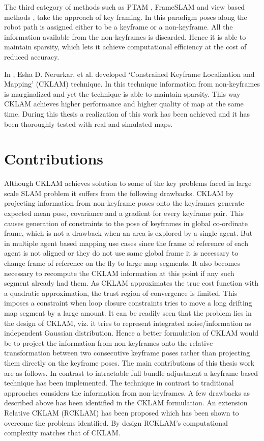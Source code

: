 The third category of methods such as PTAM \cite{klein07parallel}, FrameSLAM \cite{4648456} and view based methods \cite {Konolige01072010, 6630556}, take the approach of key framing. In this paradigm poses along the robot path is assigned either to be a keyframe or a non-keyframe. All the information available from the non-keyframes is discarded. Hence it is able to maintain sparsity, which lets it achieve computational efficiency at the cost of reduced accuracy. 

In \cite{CKLAM}, Esha D. Nerurkar, et al. developed `Constrained Keyframe Localization and Mapping' (CKLAM) technique. In this technique information from non-keyframes is marginalized and yet the technique is able to maintain sparsity. This way CKLAM achieves higher performance and higher quality of map at the same time. During this thesis a realization of this work has been achieved and it has been thoroughly tested with real and simulated maps. 

\section{Contributions}
Although CKLAM achieves solution to some of the key problems faced in large scale SLAM problem it suffers from the following drawbacks. CKLAM by projecting information from non-keyframe poses onto the keyframes generate expected mean pose, covariance and a gradient for every keyframe pair. This causes generation of constraints to the pose of keyframes in global co-ordinate frame, which is not a drawback when an area is explored by a single agent. But in multiple agent based mapping use cases since the frame of reference of each agent is not aligned or they do not use same global frame it is necessary to change frame of reference on the fly to large map segments. It also becomes necessary to recompute the CKLAM information at this point if any such segment already had them. As CKLAM approximates the true cost function with a quadratic approximation, the trust region of convergence is limited. This imposes a constraint when loop closure constraints tries to move a long drifting map segment by a large amount. It can be readily seen that the problem lies in the design of CKLAM, viz. it tries to represent integrated noise/information as independent Gaussian distribution. Hence a better formulation of CKLAM would be to project the information from non-keyframes onto the relative transformation between two consecutive keyframe poses rather than projecting them directly on the keyframe poses. The main contributions of this thesis work are as follows. In contrast to intractable full bundle adjustment a keyframe based technique has been implemented. The technique in contrast to traditional approaches considers the information from non-keyframes. A few drawbacks as described above has been identified in the CKLAM formulation. An extension Relative CKLAM (RCKLAM) has been proposed which has been shown to overcome the problems identified. By design RCKLAM's computational complexity matches that of CKLAM. 

